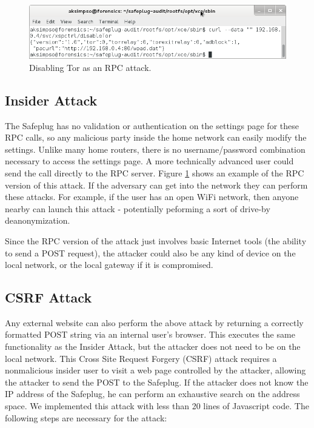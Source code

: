 \documentclass[letterpaper,twocolumn,10pt]{article}
\begin{document}
\begin{figure}
  \centering
  \includegraphics[width=.75\textwidth]{disabletor}
  \caption{Disabling Tor as an RPC attack.}
  \label{disable}
\end{figure}

\subsection{Insider Attack}
The Safeplug has no validation or authentication on the settings page for these RPC calls, so any malicious party inside the home network can easily modify the settings.  Unlike many home routers, there is no username/password combination necessary to access the settings page.  A more technically advanced user could send the call directly to the RPC server.  Figure \ref{disable} shows an example of the RPC version of this attack.  If the adversary can get into the network they can perform these attacks.  For example, if the user has an open WiFi network, then anyone nearby can launch this attack - potentially peforming a sort of drive-by deanonymization. 

Since the RPC version of the attack just involves basic Internet tools (the ability to send a POST request), the attacker could also be any kind of device on the local network, or the local gateway if it is compromised.

\subsection{CSRF Attack}
Any external website can also perform the above attack by returning a correctly formatted POST string via an internal user's browser.  This executes the same functionality as the Insider Attack, but the attacker does not need to be on the local network.  This Cross Site Request Forgery (CSRF) attack requires a nonmalicious insider user to visit a web page controlled by the attacker, allowing the attacker to send the POST to the Safeplug.  If the attacker does not know the IP address of the Safeplug, he can perform an exhaustive search on the address space.  We implemented this attack with less than 20 lines of Javascript code.  The following steps are necessary for the attack:
\end{document}
